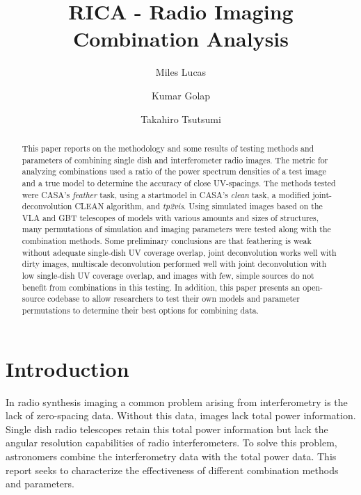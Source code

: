 \documentclass[preprint]{aastex63}
\begin{document}
\title{RICA - Radio Imaging Combination Analysis}
\author{Miles Lucas}
\author{Kumar Golap}
\author{Takahiro Tsutsumi}

\begin{abstract}
This paper reports on the methodology and some results of testing methods and parameters of combining single dish and interferometer radio images. The metric for analyzing combinations used a ratio of the power spectrum densities of a test image and a true model to determine the accuracy of close UV-spacings. The methods tested were CASA's \textit{feather} task, using a startmodel in CASA's \textit{clean} task, a modified joint-deconvolution CLEAN algorithm, and \textit{tp2vis}. Using simulated images based on the VLA and GBT telescopes of models with various amounts and sizes of structures, many permutations of simulation and imaging parameters were tested along with the combination methods. Some preliminary conclusions are that feathering is weak without adequate single-dish UV coverage overlap, joint deconvolution works well with dirty images, multiscale deconvolution performed well with joint deconvolution with low single-dish UV coverage overlap, and images with few, simple sources do not benefit from combinations in this testing. In addition, this paper presents an open-source codebase to allow researchers to test their own models and parameter permutations to determine their best options for combining data.
\end{abstract}


\section{Introduction}

In radio synthesis imaging a common problem arising from interferometry is the lack of zero-spacing data. Without this data, images lack total power information. Single dish radio telescopes retain this total power information but lack the angular resolution capabilities of radio interferometers. To solve this problem, astronomers combine the interferometry data with the total power data. This report seeks to characterize the effectiveness of different combination methods and parameters.
\end{document}

